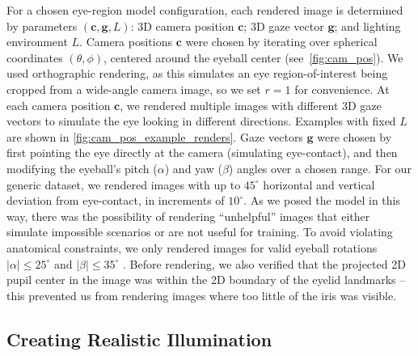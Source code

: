 For a chosen eye-region model configuration, each rendered image is determined by parameters $(\mathbf{c}, \mathbf{g}, L)$: 3D camera position $\mathbf{c}$; 3D gaze vector $\mathbf{g}$; and lighting environment $L$.
Camera positions $\mathbf{c}$ were chosen by iterating over spherical coordinates $(\theta, \phi)$, centered around the eyeball center (see~\autoref{fig:cam_pos}).
We used orthographic rendering, as this simulates an eye region-of-interest being cropped from a wide-angle camera image, so we set $r\!=\!1$ for convenience.
At each camera position $\mathbf{c}$, we rendered multiple images with different 3D gaze vectors to simulate the eye looking in different directions.
Examples with fixed $L$ are shown in \autoref{fig:cam_pos_example_renders}.
Gaze vectors $\mathbf{g}$ were chosen by first pointing the eye directly at the camera (simulating eye-contact), and then modifying the eyeball's pitch ($\alpha$) and yaw ($\beta$) angles over a chosen range.
For our generic dataset, we rendered images with up to $45^{\circ}$ horizontal and vertical deviation from eye-contact, in increments of $10^{\circ}$.
%
As we posed the model in this way, there was the possibility of rendering ``unhelpful'' images that either simulate impossible scenarios or are not useful for training.
To avoid violating anatomical constraints, we only rendered images for valid eyeball rotations $|\alpha|\!\leq\!25^{\circ}$ and $|\beta|\!\leq\!35^{\circ}$ \cite{MIL-STD-1472G}.
Before rendering, we also verified that the projected 2D pupil center in the image was within the 2D boundary of the eyelid landmarks -- this prevented us from rendering images where too little of the iris was visible.

\subsection{Creating Realistic Illumination}

